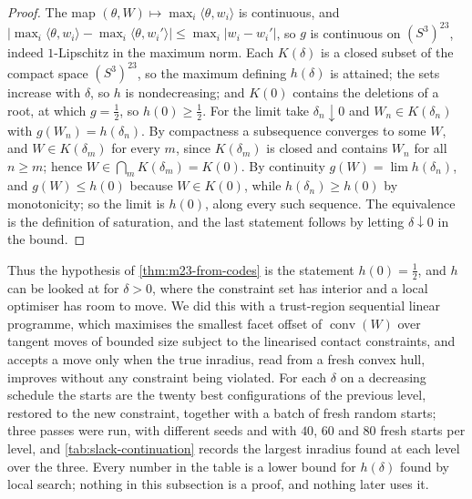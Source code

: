 \documentclass[11pt,reqno]{amsart}
\renewcommand{\_}{\origunderscore\allowbreak}
\numberwithin{equation}{section}
\theoremstyle{plain}
\theoremstyle{definition}
\theoremstyle{remark}
\DeclareMathOperator{\conv}{conv}
\begin{document}
\begin{proof}
The map $(\theta,W)\mapsto\max_i\langle\theta,w_i\rangle$ is continuous,
and $|\max_i\langle\theta,w_i\rangle-\max_i\langle\theta,w_i'\rangle|
\le\max_i|w_i-w_i'|$, so $g$ is continuous on $(S^3)^{23}$, indeed
$1$-Lipschitz in the maximum norm. Each $K(\delta)$ is a closed subset
of the compact space $(S^3)^{23}$, so the maximum defining $h(\delta)$
is attained; the sets increase with $\delta$, so $h$ is nondecreasing;
and $K(0)$ contains the deletions of a root, at which $g=\tfrac12$, so
$h(0)\ge\tfrac12$. For the limit take $\delta_n\downarrow0$ and
$W_n\in K(\delta_n)$ with $g(W_n)=h(\delta_n)$. By compactness a
subsequence converges to some $W$, and $W\in K(\delta_m)$ for every $m$,
since $K(\delta_m)$ is closed and contains $W_n$ for all $n\ge m$; hence
$W\in\bigcap_mK(\delta_m)=K(0)$. By continuity $g(W)=\lim h(\delta_n)$,
and $g(W)\le h(0)$ because $W\in K(0)$, while $h(\delta_n)\ge h(0)$ by
monotonicity; so the limit is $h(0)$, along every such sequence. The
equivalence is the definition of saturation, and the last statement
follows by letting $\delta\downarrow0$ in the bound.
\end{proof}

Thus the hypothesis of \cref{thm:m23-from-codes} is the statement
$h(0)=\tfrac12$, and $h$ can be looked at
for $\delta>0$, where the constraint set has interior and a local
optimiser has room to move. We did this with a trust-region sequential
linear programme, which maximises the smallest facet offset of
$\conv(W)$ over tangent moves of bounded size subject to the linearised
contact constraints, and accepts a move only when the true inradius,
read from a fresh convex hull, improves without any constraint being
violated. For each $\delta$ on a
decreasing schedule the starts are the twenty best configurations of
the previous level, restored to the new constraint, together with a
batch of fresh random starts; three passes were run, with different
seeds and with $40$, $60$ and $80$ fresh starts per level, and
\cref{tab:slack-continuation} records the largest inradius found at
each level over the three. Every number in the table is a lower bound
for $h(\delta)$ found by local search; nothing in this subsection is a
proof, and nothing later uses it.
\end{document}
